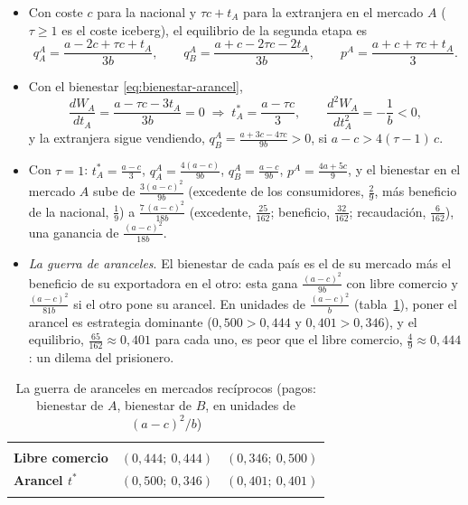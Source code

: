 \documentclass[11pt]{article}
\begin{document}
\begin{itemize}
\item Con coste $c$ para la nacional y $\tau c+t_A$ para la extranjera en el mercado $A$ ($\tau\geq1$ es el coste iceberg), el equilibrio de la segunda etapa es
  $$q_A^A=\frac{a-2c+\tau c+t_A}{3b},\qquad q_B^A=\frac{a+c-2\tau c-2t_A}{3b},\qquad p^A=\frac{a+c+\tau c+t_A}{3}.$$
\item Con el bienestar \eqref{eq:bienestar-arancel},
  $$\frac{dW_A}{dt_A}=\frac{a-\tau c-3t_A}{3b}=0\;\Longrightarrow\;t_A^*=\frac{a-\tau c}{3},\qquad\frac{d^2W_A}{dt_A^2}=-\frac{1}{b}<0,$$
  y la extranjera sigue vendiendo, $q_B^A=\frac{a+3c-4\tau c}{9b}>0$, si $a-c>4(\tau-1)\,c$.
\item Con $\tau=1$: $t_A^*=\frac{a-c}{3}$, $q_A^A=\frac{4(a-c)}{9b}$, $q_B^A=\frac{a-c}{9b}$, $p^A=\frac{4a+5c}{9}$, y el bienestar en el mercado $A$ sube de $\frac{3(a-c)^2}{9b}$ (excedente de los consumidores, $\frac{2}{9}$, más beneficio de la nacional, $\frac{1}{9}$) a $\frac{7\,(a-c)^2}{18b}$ (excedente, $\frac{25}{162}$; beneficio, $\frac{32}{162}$; recaudación, $\frac{6}{162}$), una ganancia de $\frac{(a-c)^2}{18b}$.
\item \emph{La guerra de aranceles}. El bienestar de cada país es el de su mercado más el beneficio de su exportadora en el otro: esta gana $\frac{(a-c)^2}{9b}$ con libre comercio y $\frac{(a-c)^2}{81b}$ si el otro pone su arancel. En unidades de $\frac{(a-c)^2}{b}$ (tabla~\ref{tab:guerra-aranceles}), poner el arancel es estrategia dominante ($0{,}500>0{,}444$ y $0{,}401>0{,}346$), y el equilibrio, $\frac{65}{162}\approx0{,}401$ para cada uno, es peor que el libre comercio, $\frac{4}{9}\approx0{,}444$: un dilema del prisionero.\findemo
\end{itemize}

\begin{table}[H]
\centering
\caption{La guerra de aranceles en mercados recíprocos (pagos: bienestar de $A$, bienestar de $B$, en unidades de $(a-c)^2/b$)}\label{tab:guerra-aranceles}
\begin{tabular}{>{\centering\arraybackslash}m{3.0cm}|>{\centering\arraybackslash}m{3.0cm}|>{\centering\arraybackslash}m{3.0cm}|}
\multicolumn{1}{c}{$A$ \textbackslash\ $B$} & \multicolumn{1}{c}{\textbf{Libre comercio}} & \multicolumn{1}{c}{\textbf{Arancel $t^*$}}\\
\hhline{~|-|-|}
\textbf{Libre comercio} & $(0{,}444;\ 0{,}444)$ & $(0{,}346;\ 0{,}500)$\\
\hhline{~|-|-|}
\textbf{Arancel $t^*$} & $(0{,}500;\ 0{,}346)$ & \cellcolor{tceesalvia}$(0{,}401;\ 0{,}401)$\\
\hhline{~|-|-|}
\end{tabular}
\end{table}
\end{document}
